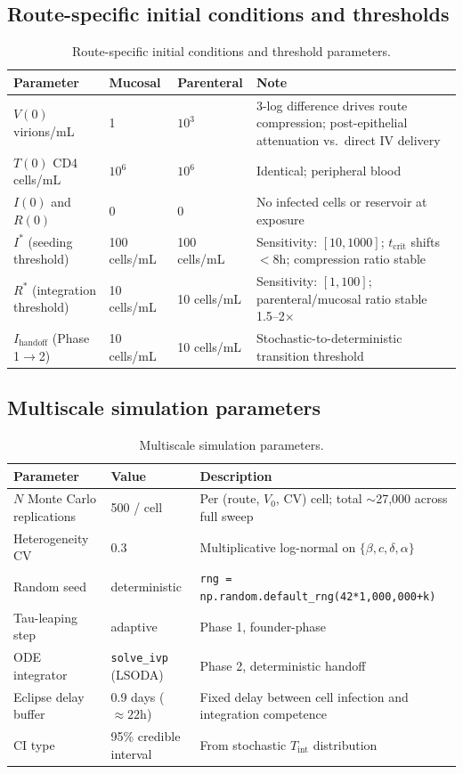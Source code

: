 \documentclass[11pt]{article}
\theoremstyle{definition}
\theoremstyle{remark}
\newcommand{\Tint}{T_{\text{int}}}
\newcommand{\tcrit}{t_{\text{crit}}}
\begin{document}
\subsection{Route-specific initial conditions and thresholds}

\begin{table}[H]
\centering
\small
\caption{Route-specific initial conditions and threshold parameters.}
\begin{tabular}{@{}lllp{6cm}@{}}
\toprule
\textbf{Parameter} & \textbf{Mucosal} & \textbf{Parenteral} & \textbf{Note} \\
\midrule
$V(0)$ virions/mL & 1 & $10^{3}$ & 3-log difference drives route compression; post-epithelial attenuation vs.\ direct IV delivery \\
$T(0)$ CD4 cells/mL & $10^{6}$ & $10^{6}$ & Identical; peripheral blood \\
$I(0)$ and $R(0)$ & 0 & 0 & No infected cells or reservoir at exposure \\
$I^{*}$ (seeding threshold) & 100 cells/mL & 100 cells/mL & Sensitivity: $[10, 1000]$; $\tcrit$ shifts $<8$h; compression ratio stable \\
$R^{*}$ (integration threshold) & 10 cells/mL & 10 cells/mL & Sensitivity: $[1, 100]$; parenteral/mucosal ratio stable 1.5--2$\times$ \\
$I_{\text{handoff}}$ (Phase 1$\to$2) & 10 cells/mL & 10 cells/mL & Stochastic-to-deterministic transition threshold \\
\bottomrule
\end{tabular}
\end{table}

\subsection{Multiscale simulation parameters}

\begin{table}[H]
\centering
\small
\caption{Multiscale simulation parameters.}
\begin{tabular}{@{}lll@{}}
\toprule
\textbf{Parameter} & \textbf{Value} & \textbf{Description} \\
\midrule
$N$ Monte Carlo replications & 500 / cell & Per (route, $V_{0}$, CV) cell; total $\sim$27{,}000 across full sweep \\
Heterogeneity CV & 0.3 & Multiplicative log-normal on $\{\beta, c, \delta, \alpha\}$ \\
Random seed & deterministic & \texttt{rng = np.random.default\_rng(42*1{,}000{,}000+k)} \\
Tau-leaping step & adaptive & Phase 1, founder-phase \\
ODE integrator & \texttt{solve\_ivp} (LSODA) & Phase 2, deterministic handoff \\
Eclipse delay buffer & 0.9 days ($\approx 22$h) & Fixed delay between cell infection and integration competence \\
CI type & 95\% credible interval & From stochastic $\Tint$ distribution \\
\bottomrule
\end{tabular}
\end{table}
\end{document}
